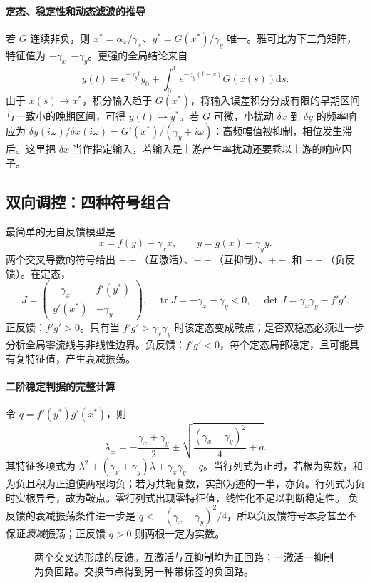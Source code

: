 \documentclass[11pt,a4paper,UTF8,fontset=fandol]{ctexart}
\newcommand{\dd}{\mathrm d}\newcommand{\R}{\mathbb R}\newcommand{\ssv}{\mathrm{ss}}
\begin{document}
\paragraph{定态、稳定性和动态滤波的推导}
若 $G$ 连续非负，则 $x^*=\alpha_x/\gamma_x$、$y^*=G(x^*)/\gamma_y$ 唯一。雅可比为下三角矩阵，特征值为 $-\gamma_x,-\gamma_y$。更强的全局结论来自
\[
y(t)=e^{-\gamma_yt}y_0+\int_0^t e^{-\gamma_y(t-s)}G(x(s))\dd s.
\]
由于 $x(s)\to x^*$，积分输入趋于 $G(x^*)$，将输入误差积分分成有限的早期区间与一致小的晚期区间，可得 $y(t)\to y^*$。若 $G$ 可微，小扰动 $\delta x$ 到 $\delta y$ 的频率响应为
$\delta y(i\omega)/\delta x(i\omega)=G'(x^*)/(\gamma_y+i\omega)$：高频幅值被抑制，相位发生滞后。这里把 $\delta x$ 当作指定输入，若输入是上游产生率扰动还要乘以上游的响应因子。


\subsection{双向调控：四种符号组合}
最简单的无自反馈模型是
\begin{equation}\dot x=f(y)-\gamma_xx,\qquad\dot y=g(x)-\gamma_yy.\label{eq:two}\end{equation}
两个交叉导数的符号给出 $++$（互激活）、$--$（互抑制）、$+-$ 和 $-+$（负反馈）。在定态，
\begin{equation}J=\begin{pmatrix}-\gamma_x&f'(y^*)\\g'(x^*)&-\gamma_y\end{pmatrix},\quad \operatorname{tr}J=-\gamma_x-\gamma_y<0,\quad\det J=\gamma_x\gamma_y-f'g'.\end{equation}
正反馈：$f'g'>0$。只有当 $f'g'>\gamma_x\gamma_y$ 时该定态变成鞍点；是否双稳态必须进一步分析全局零流线与非线性边界。负反馈：$f'g'<0$，每个定态局部稳定，且可能具有复特征值，产生衰减振荡。


\paragraph{二阶稳定判据的完整计算}
令 $q=f'(y^*)g'(x^*)$，则
\[
\lambda_{\pm}=-\frac{\gamma_x+\gamma_y}{2}
\pm\sqrt{\frac{(\gamma_x-\gamma_y)^2}{4}+q}.
\]
其特征多项式为 $\lambda^2+(\gamma_x+\gamma_y)\lambda+\gamma_x\gamma_y-q$。当行列式为正时，若根为实数，和为负且积为正迫使两根均负；若为共轭复数，实部为迹的一半，亦负。行列式为负时实根异号，故为鞍点。零行列式出现零特征值，线性化不足以判断稳定性。
负反馈的衰减振荡条件进一步是
$q<-(\gamma_x-\gamma_y)^2/4$，所以负反馈符号本身甚至不保证\emph{衰减}振荡；正反馈 $q>0$ 则两根一定为实数。
\begin{figure}[htbp]\centering
{}
\caption{两个交叉边形成的反馈。互激活与互抑制均为正回路；一激活一抑制为负回路。交换节点得到另一种带标签的负回路。}
\end{figure}
\end{document}
